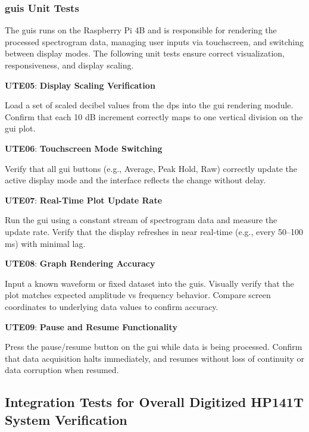 \documentclass[class=report,11pt,crop=false]{standalone}
\begin{document}
	\subsubsection{\acrshort{guis} Unit Tests}
	The \acrshort{guis} runs on the Raspberry Pi 4B and is responsible for rendering the processed spectrogram data, managing user inputs via touchscreen, and switching between display modes. The following unit tests ensure correct visualization, responsiveness, and display scaling.
	
	\begin{center}
		\textbf{UTE05}: \textbf{Display Scaling Verification}
	\end{center}
	Load a set of scaled decibel values from the \acrshort{dps} into the \acrshort{gui} rendering module. Confirm that each 10 dB increment correctly maps to one vertical division on the \acrshort{gui} plot.
	
	\begin{center}
		\textbf{UTE06}: \textbf{Touchscreen Mode Switching}
	\end{center}
	Verify that all \acrshort{gui} buttons (e.g., Average, Peak Hold, Raw) correctly update the active display mode and the interface reflects the change without delay.
	
	\begin{center}
		\textbf{UTE07}: \textbf{Real-Time Plot Update Rate}
	\end{center}
	Run the \acrshort{gui} using a constant stream of spectrogram data and measure the update rate. Verify that the display refreshes in near real-time (e.g., every 50–100 ms) with minimal lag.
	
	\begin{center}
		\textbf{UTE08}: \textbf{Graph Rendering Accuracy}
	\end{center}
	Input a known waveform or fixed dataset into the \acrshort{guis}. Visually verify that the plot matches expected amplitude vs frequency behavior. Compare screen coordinates to underlying data values to confirm accuracy.
	
	\begin{center}
		\textbf{UTE09}: \textbf{Pause and Resume Functionality}
	\end{center}
	Press the pause/resume button on the \acrshort{gui} while data is being processed. Confirm that data acquisition halts immediately, and resumes without loss of continuity or data corruption when resumed.
	
	\subsection{Integration Tests for Overall Digitized HP141T System Verification}
	
\end{document}
